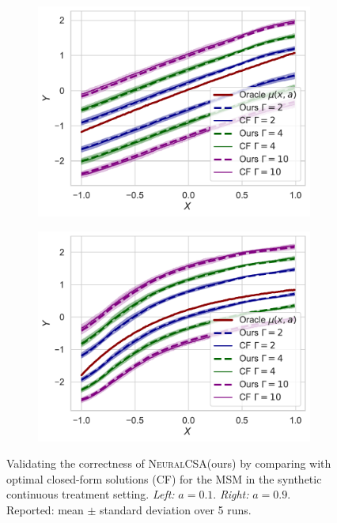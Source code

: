 \documentclass{article} %
\newcommand{\frameworkname}{\textsc{NeuralCSA}\xspace}
\theoremstyle{definition}
\theoremstyle{plain}
\begin{document}
\begin{figure}[ht]
 \centering
\begin{subfigure}{0.45\textwidth}
  \centering
  \includegraphics[width=1\linewidth]{figures/plot_continuous_1D_a01.pdf}
\end{subfigure}%
\begin{subfigure}{0.45\textwidth}
  \centering
  \includegraphics[width=1\linewidth]{figures/plot_continuous_1D_a09.pdf}
\end{subfigure}
\caption{Validating the correctness of \frameworkname (ours) by comparing with optimal closed-form solutions (CF) for the MSM in the synthetic continuous treatment setting. \emph{Left:} $a=0.1$. \emph{Right:} $a=0.9$. Reported: mean $\pm$ standard deviation over 5 runs.}
\label{fig:app_treat}
\end{figure}
\end{document}
